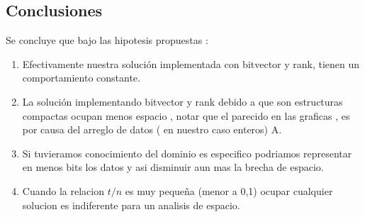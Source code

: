 \documentclass[11pt]{article}
\begin{document}
\subsection{Conclusiones}

Se concluye que bajo las hipotesis propuestas :
\begin{enumerate}
    \item Efectivamente nuestra solución implementada con bitvector y rank, tienen un comportamiento constante.
    \item La solución implementando bitvector y rank debido a que son estructuras compactas ocupan menos espacio , notar que el parecido en las graficas , es por causa del arreglo de datos ( en nuestro caso enteros) A.
    \item Si tuvieramos conocimiento del dominio es especifico podriamos representar en menos bits los datos y asi disminuir aun mas la brecha de espacio.
    \item Cuando la relacion $t/n$ es muy pequeña (menor a 0,1) ocupar cualquier solucion es indiferente para un analisis de espacio.
\end{enumerate}
\end{document}
